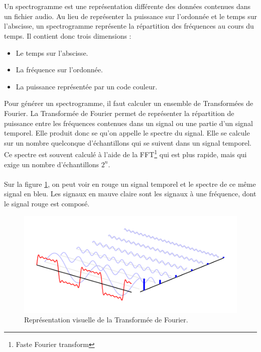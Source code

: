 \documentclass[11pt]{article}
\begin{document}
\\
\\
Un spectrogramme est une représentation différente des données contenues dans un fichier audio.
Au lieu de représenter la puissance sur l'ordonnée et le temps sur l'abscisse, un spectrogramme représente la répartition des fréquences au cours du temps.
Il contient donc trois dimensions :
\begin{itemize}
    \item Le temps sur l'abscisse.
    \item La fréquence sur l'ordonnée.
    \item La puissance représentée par un code couleur.\\
\end{itemize}

Pour générer un spectrogramme, il faut calculer un ensemble de Transformées de Fourier.
La Transformée de Fourier permet de représenter la répartition de puissance entre les fréquences contenues dans un signal ou une partie d'un signal temporel.
Elle produit donc se qu'on appelle le spectre du signal.
Elle se calcule sur un nombre quelconque d'échantillons qui se suivent dans un signal temporel.
Ce spectre est souvent calculé à l'aide de la FFT\footnote{Faste Fourier transform} qui est plus rapide, mais qui exige un nombre d'échantillons $2^{n}$.\\
\\
Sur la figure \ref{fig:expl_fourier}, on peut voir en rouge un signal temporel et le spectre de ce même signal en bleu.
Les signaux en mauve claire sont les signaux à une fréquence, dont le signal rouge est composé.
\begin{figure}[t]
    \begin{center}
        \includegraphics[scale=0.7]{spectre.png}
        \caption{Représentation visuelle de la Transformée de Fourier.}
        \label{fig:expl_fourier}
    \end{center}
\end{figure}
\end{document}
